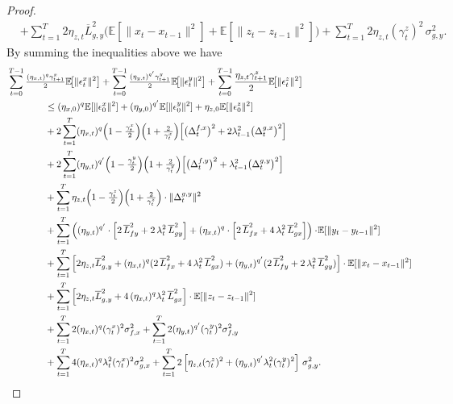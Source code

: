 \documentclass{uai2026} %
\newcommand{\EE}{\mathbb{E}}
\begin{document}
\begin{proof}
\begin{align}
&+ \sum_{t=1}^{T}2\eta_{z,t}\overline L_{g,y}^2\Big(\mathbb{E}[\|x_t-x_{t-1}\|^2]+\mathbb{E}[\|z_t-z_{t-1}\|^2]\Big)
+ \sum_{t=1}^{T}2\eta_{z,t}(\gamma_t^z)^2\,\sigma_{g,y}^2.\label{eq_0096}
\end{align}
By summing the inequalities above we have
\begin{align}
 \MoveEqLeft[4]\sum_{t=0}^{T-1}\tfrac{(\eta_{x,t})^{q}\gamma_{t+1}^x}{2}\EE\!\big[\|\epsilon_t^x\|^2\big]+\sum_{t=0}^{T-1}\tfrac{(\eta_{y,t})^{q'}\gamma_{t+1}^y}{2}\EE\!\big[\|\epsilon_t^y\|^2\big]+\sum_{t=0}^{T-1}\frac{\eta_{z,t}\gamma_{t+1}^{z}}{2}\EE\!\big[\|\epsilon_t^z\|^2\big]\nonumber\\
 &\le (\eta_{x,0})^{q}\mathbb{E}[\|\epsilon_{0}^{x}\|^{2}]+(\eta_{y,0})^{q'}\mathbb{E}[\|\epsilon_{0}^y\|^2]+\eta_{z,0}\mathbb{E}[\|\epsilon_{0}^z\|^2]\nonumber\\
 &
+ 2\sum_{t=1}^{T}(\eta_{x,t})^{q}\Big(1-\tfrac{\gamma_t^x}{2}\Big)\Big(1+\tfrac{2}{\gamma_t^x}\Big)\!\left[
\big(\Delta_t^{f,x}\big)^2+2\lambda_{t-1}^2\big(\Delta_t^{g,x}\big)^2\right]\notag\\
&+ 2\sum_{t=1}^{T}(\eta_{y,t})^{q'}\Big(1-\tfrac{\gamma_t^y}{2}\Big)\Big(1+\tfrac{2}{\gamma_t^y}\Big)\!\left[
\big(\Delta_t^{f,y}\big)^2+\lambda_{t-1}^2\big(\Delta_t^{g,y}\big)^2\right]\notag\\
&+ \sum_{t=1}^{T}\eta_{z,t}\Big(1-\tfrac{\gamma_t^z}{2}\Big)\Big(1+\tfrac{2}{\gamma_t^z}\Big)\cdot\|\Delta_{t}^{g,y}\|^{2}\nonumber\\
&+ \sum_{t=1}^{T}\left((\eta_{y,t})^{q'}\cdot\left[2\,\overline L_{fy}^2+ 2\,\lambda_t^2\,\overline L_{gy}^2\right]+(\eta_{x,t})^{q}\cdot\left[2\,\overline L_{fx}^2+4\,\lambda_t^2\,\overline L_{gx}^2\right]\right)\cdot\!\mathbb{E}[\|y_t-y_{t-1}\|^2]\notag\\
&+ \sum_{t=1}^{T}\left[2\eta_{z,t}\overline L_{g,y}^2+(\eta_{x,t})^{q}(2\,\overline L_{fx}^2+4\,\lambda_t^2\,\overline L_{gx}^2)+(\eta_{y,t})^{q'}(2\,\overline L_{fy}^2+ 2\,\lambda_t^2\,\overline L_{gy}^2)\right]\cdot\mathbb{E}[\|x_t-x_{t-1}\|^2]\nonumber\\
&+ \sum_{t=1}^{T}\left[2\eta_{z,t}\overline L_{g,y}^2+4\,(\eta_{x,t})^{q}\lambda_t^2\,\overline L_{gx}^2\right]\cdot\mathbb{E}[\|z_t-z_{t-1}\|^2]\nonumber\\
&+\sum_{t=1}^{T}2(\eta_{x,t})^{q}(\gamma_t^x)^2\sigma_{f,x}^2+\sum_{t=1}^{T}2(\eta_{y,t})^{q'}(\gamma_t^y)^2\sigma_{f,y}^2\nonumber\\
&+\sum_{t=1}^{T}4(\eta_{x,t})^{q}\lambda_t^2(\gamma_t^x)^2\sigma_{g,x}^2+ \sum_{t=1}^{T}2\left[\eta_{z,t}(\gamma_t^z)^2+(\eta_{y,t})^{q'}\lambda_t^2(\gamma_t^y)^2\right]\,\sigma_{g,y}^2.\label{eq_00097}
\end{align}



\end{proof}
\end{document}
